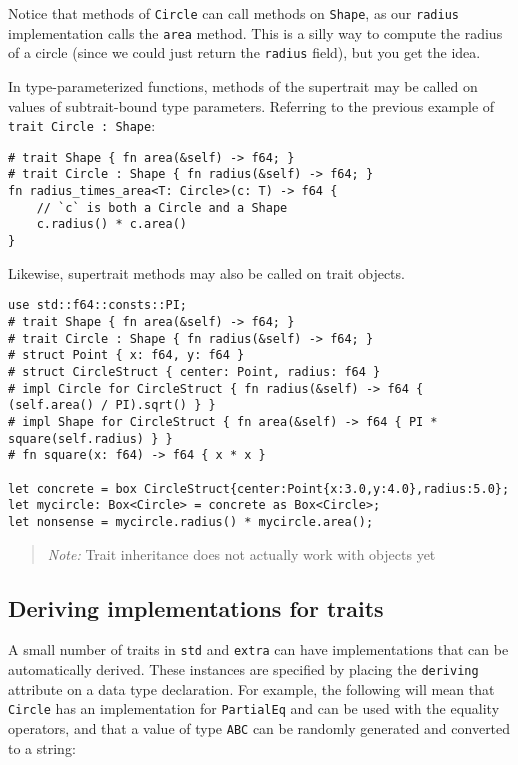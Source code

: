 \documentclass[]{article}
\begin{document}
Notice that methods of \texttt{Circle} can call methods on
\texttt{Shape}, as our \texttt{radius} implementation calls the
\texttt{area} method. This is a silly way to compute the radius of a
circle (since we could just return the \texttt{radius} field), but you
get the idea.

In type-parameterized functions, methods of the supertrait may be called
on values of subtrait-bound type parameters. Referring to the previous
example of \texttt{trait Circle : Shape}:

\begin{verbatim}
# trait Shape { fn area(&self) -> f64; }
# trait Circle : Shape { fn radius(&self) -> f64; }
fn radius_times_area<T: Circle>(c: T) -> f64 {
    // `c` is both a Circle and a Shape
    c.radius() * c.area()
}
\end{verbatim}

Likewise, supertrait methods may also be called on trait objects.

\begin{verbatim}
use std::f64::consts::PI;
# trait Shape { fn area(&self) -> f64; }
# trait Circle : Shape { fn radius(&self) -> f64; }
# struct Point { x: f64, y: f64 }
# struct CircleStruct { center: Point, radius: f64 }
# impl Circle for CircleStruct { fn radius(&self) -> f64 { (self.area() / PI).sqrt() } }
# impl Shape for CircleStruct { fn area(&self) -> f64 { PI * square(self.radius) } }
# fn square(x: f64) -> f64 { x * x }

let concrete = box CircleStruct{center:Point{x:3.0,y:4.0},radius:5.0};
let mycircle: Box<Circle> = concrete as Box<Circle>;
let nonsense = mycircle.radius() * mycircle.area();
\end{verbatim}

\begin{quote}
\emph{Note:} Trait inheritance does not actually work with objects yet
\end{quote}

\subsection{Deriving implementations for
traits}\label{deriving-implementations-for-traits}

A small number of traits in \texttt{std} and \texttt{extra} can have
implementations that can be automatically derived. These instances are
specified by placing the \texttt{deriving} attribute on a data type
declaration. For example, the following will mean that \texttt{Circle}
has an implementation for \texttt{PartialEq} and can be used with the
equality operators, and that a value of type \texttt{ABC} can be
randomly generated and converted to a string:
\end{document}
